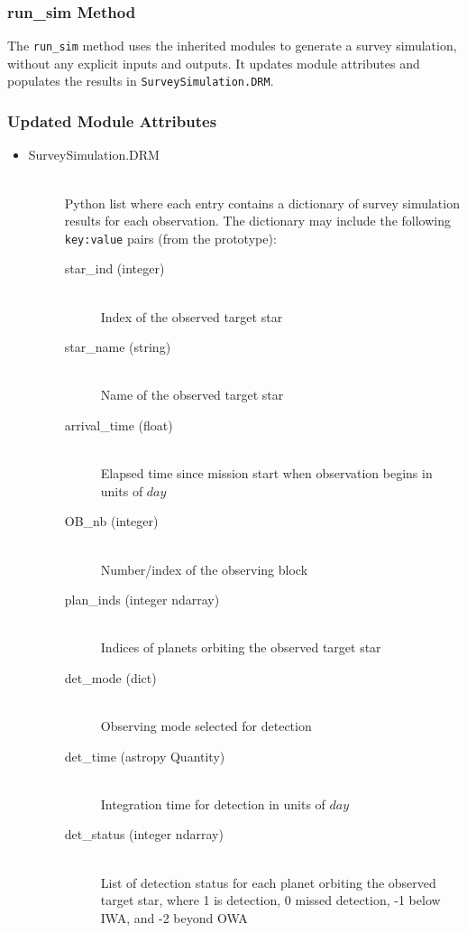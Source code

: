 \documentclass[cleanfoot]{asme2ej}
\begin{document}
\subsubsection{run\_sim Method} \label{sec:runsimtask}
The \verb+run_sim+ method uses the inherited modules to generate a survey simulation, without any explicit inputs and outputs. It updates module attributes and populates the results in \verb+SurveySimulation.DRM+.

\subsubsection*{Updated Module Attributes}
\begin{itemize}
\item 
\begin{description}
    \item[SurveySimulation.DRM] \hfill \\ Python list where each entry contains a dictionary of survey simulation results for each observation.  The dictionary may include the following \verb+key:value+ pairs (from the prototype):
    \begin{description}
        \item[star\_ind (integer)] \hfill \\ Index of the observed target star
        \item[star\_name (string)] \hfill \\ Name of the observed target star
        \item[arrival\_time (float)] \hfill \\ Elapsed time since mission start when observation begins in units of $day$
        \item[OB\_nb (integer)] \hfill \\ Number/index of the observing block
        \item[plan\_inds (integer ndarray)] \hfill \\ Indices of planets orbiting the observed target star
        \item[det\_mode (dict)] \hfill \\ Observing mode selected for detection
        \item[det\_time (astropy Quantity)] \hfill \\ Integration time for detection in units of $ day $
        \item[det\_status (integer ndarray)] \hfill \\ List of detection status for each planet orbiting the observed target star, where 1 is detection, 0 missed detection, -1 below IWA, and -2 beyond OWA

\end{description}
\end{description}
\end{itemize}
\end{document}
